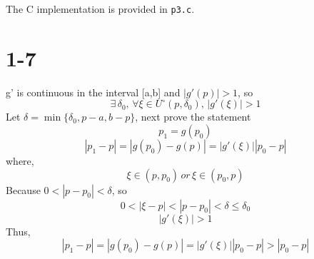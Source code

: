 \documentclass[11pt,a4paper]{report}
\theoremstyle{remark}
\begin{document}
The C implementation is provided in \texttt{p3.c}.
\section*{1-7}
g' is continuous in the interval [a,b] and $|g'(p)|>1$, so
\[
\exists \, \delta_0, \, \forall \xi \in U^\circ(p,\delta_0), \, |g'(\xi)|>1
\]
Let $\delta = \min\{\delta_0,p-a,b-p\}$, next prove the statement
\[
p_1=g(p_0)
\]
\[
|p_1-p|=|g(p_0)-g(p)|=|g'(\xi)||p_0-p|
\]
where,
\[
\xi \in (p,p_0) \, or \, \xi \in (p_0,p)
\]
Because $0<|p-p_0|<\delta$, so
\[
0<|\xi-p|<|p-p_0|<\delta \le \delta_0
\]
\[
|g'(\xi)|>1
\]
Thus, 
\[
|p_1-p|=|g(p_0)-g(p)|=|g'(\xi)||p_0-p|>|p_0-p|
\]
\end{document}
